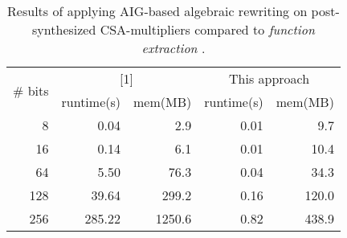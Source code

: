 \begin{table}[!htb]
\centering
\caption{Results of applying AIG-based algebraic rewriting on post-synthesized CSA-multipliers compared to \textit{function extraction} \cite{ciesielski2015verification}.}
\label{tbl:post}
\begin{tabular}{|r|r|r|r|r|}
\hline
\multirow{2}{*}{\# bits} & \multicolumn{2}{c|}{{[}1{]}} & \multicolumn{2}{c|}{This approach} \\ \cline{2-5} 
 & runtime(s) & mem(MB) & runtime(s) & mem(MB) \\ \hline
8 & 0.04 & 2.9 & 0.01 & 9.7 \\ \hline
16 & 0.14 & 6.1 & 0.01 & 10.4 \\ \hline
64 & 5.50 & 76.3 & 0.04 & 34.3 \\ \hline
128 & 39.64 & 299.2 & 0.16 & 120.0 \\ \hline
256 & 285.22 & 1250.6 & 0.82 & 438.9 \\ \hline
\end{tabular}
\end{table}